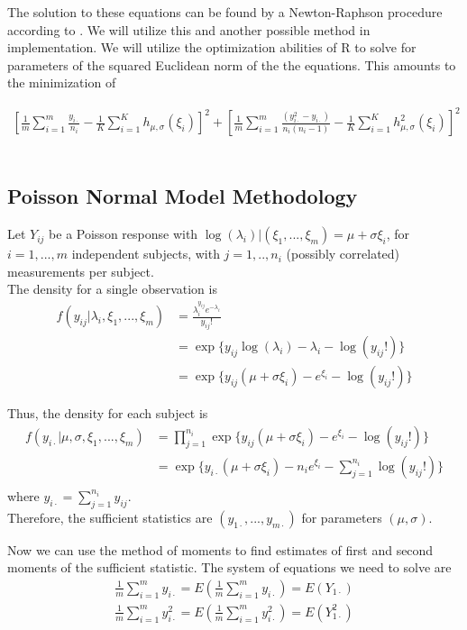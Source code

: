 \documentclass[11pt]{article}\usepackage[]{graphicx}\usepackage[]{color}
\begin{document}
The solution to these equations can be found by a Newton-Raphson procedure according to \cite{jiang}.  We will utilize this and another possible method in implementation.  We will utilize the optimization abilities of R to solve for parameters of the squared Euclidean norm of the the equations.  This amounts to the minimization of 

\begin{align*}
\left[\frac{1}{m}\sum_{i=1}^m \frac{y_{i\cdot}}{n_i}-\frac{1}{K}\sum_{i=1}^K h_{\mu,\sigma}(\xi_i)\right]^2+\left[\frac{1}{m}\sum_{i=1}^m \frac{(y_{i\cdot}^2-y_{i\cdot})}{n_i(n_i-1)}-\frac{1}{K}\sum_{i=1}^K h_{\mu,\sigma}^2(\xi_i)\right]^2
\end{align*}
\\

\subsection{Poisson Normal Model Methodology}

Let $Y_{ij}$ be a Poisson response with $\log(\lambda_i)|(\xi_1,...,\xi_m)=\mu+ \sigma\xi_i$, for $i=1,...,m$ independent subjects, with $j=1,..,n_i$ (possibly correlated) measurements per subject.\\

The density for a single observation is
\begin{align*}
f(y_{ij}|\lambda_i,\xi_1,...,\xi_m)&=\frac{\lambda_i^{y_{ij}}e^{-\lambda_i}}{y_{ij}!}\\
&=\exp\{y_{ij}\log(\lambda_i)-\lambda_i-\log(y_{ij}!)\}\\
&=\exp\{y_{ij}(\mu+\sigma\xi_i)-e^{\xi_i}-\log(y_{ij}!)\}
\end{align*}

Thus, the density for each subject is 
\begin{align*}
f(y_{i\cdot}|\mu,\sigma,\xi_1,...,\xi_m)&=\prod_{j=1}^{n_i}\exp\{y_{ij}(\mu+\sigma\xi_i)-e^{\xi_i}-\log(y_{ij}!)\}\\
&=\exp\{y_{i\cdot}(\mu+\sigma\xi_i)-n_ie^{\xi_i}-\sum_{j=1}^{n_i}\log(y_{ij}!)\}\\
\end{align*}
where $y_{i\cdot}=\sum_{j=1}^{n_i}{y_{ij}}$.\\

Therefore, the sufficient statistics are $(y_{1\cdot},...,y_{m\cdot})$ for parameters $(\mu,\sigma)$. 

Now we can use the method of moments to find estimates of first and second moments of the sufficient statistic.  The system of equations we need to solve are 
\begin{align*}
\frac{1}{m}\sum_{i=1}^m y_{i\cdot}=E\left(\frac{1}{m}\sum_{i=1}^m y_{i\cdot}\right)=E(Y_{1\cdot})\\
\frac{1}{m}\sum_{i=1}^m y_{i\cdot}^2=E\left(\frac{1}{m}\sum_{i=1}^m y_{i\cdot}^2\right)=E(Y_{1\cdot}^2) 
\end{align*}
\end{document}
